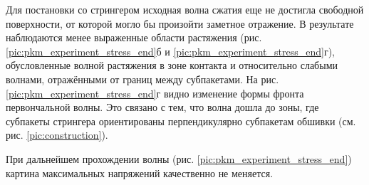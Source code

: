 Для постановки со стрингером исходная волна сжатия еще не достигла свободной поверхности, от которой могло бы произойти заметное отражение. В результате наблюдаются менее выраженные области растяжения (рис. \ref{pic:pkm_experiment_stress_end}б и \ref{pic:pkm_experiment_stress_end}г), обусловленные волной растяжения в зоне контакта и относительно слабыми волнами, отражёнными от границ между субпакетами. На рис. \ref{pic:pkm_experiment_stress_end}г видно изменение формы фронта первончальной волны. Это связано с тем, что волна дошла до зоны, где субпакеты стрингера ориентированы перпендикулярно субпакетам обшивки (см. рис. \ref{pic:construction}).

При дальнейшем прохождении волны (рис. \ref{pic:pkm_experiment_stress_end}) картина максимальных напряжений качественно не меняется.

